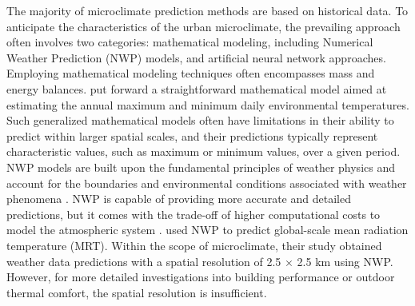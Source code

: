 \documentclass[a4paper,fleqn]{cas-sc}
\begin{document}
The majority of microclimate prediction methods are based on historical data. To anticipate the characteristics of the urban microclimate, the prevailing approach often involves two categories: mathematical modeling, including Numerical Weather Prediction (NWP) models, and artificial neural network approaches. Employing mathematical modeling techniques often encompasses mass and energy balances. \cite{quemada2021simple} put forward a straightforward mathematical model aimed at estimating the annual maximum and minimum daily environmental temperatures. Such generalized mathematical models often have limitations in their ability to predict within larger spatial scales, and their predictions typically represent characteristic values, such as maximum or minimum values, over a given period. NWP models are built upon the fundamental principles of weather physics and account for the boundaries and environmental conditions associated with weather phenomena \citep{mathiesen2011evaluation}. NWP is capable of providing more accurate and detailed predictions, but it comes with the trade-off of higher computational costs to model the atmospheric system \citep{aggarwal2013comprehensive}. \cite{di2020mean} used NWP to predict global-scale mean radiation temperature (MRT). Within the scope of microclimate, their study obtained weather data predictions with a spatial resolution of 2.5 $\times$ 2.5 km using NWP.  However, for more detailed investigations into building performance or outdoor thermal comfort, the spatial resolution is insufficient. 
\end{document}
